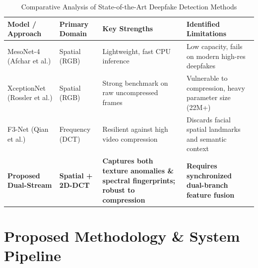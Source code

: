 \documentclass[12pt,a4paper]{report}
\begin{document}
\begin{table}[htbp]
\centering
\small
\caption{Comparative Analysis of State-of-the-Art Deepfake Detection Methods}
\label{tab:lit_comp}
\begin{tabular}{p{3.2cm} p{2.4cm} p{4.0cm} p{4.2cm}}
\toprule
\textbf{Model / Approach} & \textbf{Primary Domain} & \textbf{Key Strengths} & \textbf{Identified Limitations} \\
\midrule
MesoNet-4 (Afchar et al.) & Spatial (RGB) & Lightweight, fast CPU inference & Low capacity, fails on modern high-res deepfakes \\
\addlinespace
XceptionNet (Rossler et al.) & Spatial (RGB) & Strong benchmark on raw uncompressed frames & Vulnerable to compression, heavy parameter size (22M+) \\
\addlinespace
F3-Net (Qian et al.) & Frequency (DCT) & Resilient against high video compression & Discards facial spatial landmarks and semantic context \\
\addlinespace
\textbf{Proposed Dual-Stream} & \textbf{Spatial + 2D-DCT} & \textbf{Captures both texture anomalies \& spectral fingerprints; robust to compression} & \textbf{Requires synchronized dual-branch feature fusion} \\
\bottomrule
\end{tabular}
\end{table}

\newpage

\chapter{Proposed Methodology \& System Pipeline}
\end{document}
